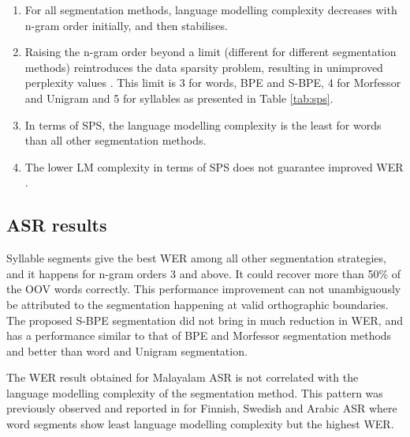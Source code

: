 \begin{enumerate}
    \item For all segmentation methods,
language modelling complexity decreases with n-gram order initially, and then
stabilises. 

\item Raising the n-gram order
beyond a limit (different for different segmentation methods) reintroduces the data sparsity problem, resulting in unimproved
perplexity values \cite{Mousa1995}. This limit is 3 for words, BPE and S-BPE, 4 for Morfessor and Unigram and 5 for syllables as presented in Table \ref{tab:sps}.

\item In terms of SPS, the language modelling complexity is the least for words than all other
segmentation methods.

\item The lower LM complexity in terms of SPS does not guarantee improved WER \cite{SMIT2021101158}.


\end{enumerate}


\subsection{ASR results}

Syllable segments give the best WER among all other segmentation strategies,
and it happens for n-gram orders 3 and above. It could recover more than 50\% of
the OOV words correctly. This performance improvement can not unambiguously be
attributed to the segmentation happening at valid orthographic boundaries. The
proposed S-BPE segmentation did not bring in much reduction in WER, and has a
performance similar to that of BPE and Morfessor segmentation methods and
better than word and Unigram segmentation.

The WER result obtained for Malayalam ASR is not correlated with the language
modelling complexity of the segmentation method. This pattern was previously
observed and reported in \cite{SMIT2021101158} for Finnish, Swedish and Arabic
ASR where word segments show least language modelling complexity but the
highest WER. 


